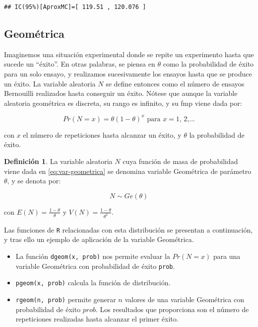 \documentclass[
]{book}
\providecommand{\tightlist}{%
  \setlength{\itemsep}{0pt}\setlength{\parskip}{0pt}}
\newenvironment{yellowbox}{
  \definecolor{shadecolor}{rgb}{210, 180, 140}  
  \color{black}
  \begin{shaded}}
 {\end{shaded}}
\newenvironment{whitebox}{
  \definecolor{shadecolor}{rgb}{255, 255, 255}  
  \color{black}
  \begin{shaded}}
 {\end{shaded}}
\theoremstyle{definition}
\newtheorem{definition}{Definición}[chapter]
\theoremstyle{definition}
\theoremstyle{definition}
\theoremstyle{definition}
\theoremstyle{remark}
\begin{document}
\begin{verbatim}
## IC(95%)[AproxMC]=[ 119.51 , 120.076 ]
\end{verbatim}

\hypertarget{geomuxe9trica}{%
\subsection{Geométrica}\label{geomuxe9trica}}

Imaginemos una situación experimental donde se repite un experimento hasta que sucede un ``éxito''. En otras palabras, se piensa en \(\theta\) como la probabilidad de éxito para un solo ensayo, y realizamos sucesivamente los ensayos hasta que se produce un éxito. La variable aleatoria \(N\) se define entonces como el número de ensayos Bernouilli realizados hasta conseguir un éxito. Nótese que aunque la variable aleatoria geométrica es discreta, su rango es inﬁnito, y su fmp viene dada por:

\begin{equation}
Pr(N = x) = \theta (1-\theta)^{x}  \text{ para } x = \text{1, 2,...}
\label{eq:var-geometrica}
\end{equation}

con \(x\) el número de repeticiones hasta alcanzar un éxito, y \(\theta\) la probabilidad de éxito.

\begin{yellowbox}

\begin{definition}
\protect\hypertarget{def:vgeom}{}{\label{def:vgeom} }La variable aleatoria \(N\) cuya función de masa de probabilidad viene dada en \eqref{eq:var-geometrica} se denomina variable Geométrica de parámetro \(\theta\), y se denota por:

\[N \sim Ge(\theta)\]

con \(E(N) = \frac{1 - \theta}{\theta}\) y \(V(N) = \frac{1-\theta}{\theta^2}.\)\\
\end{definition}

\end{yellowbox}

Las funciones de \texttt{R} relacionadas con esta distribución se presentan a continuación, y tras ello un ejemplo de aplicación de la variable Geométrica.

\begin{whitebox}

\begin{itemize}
\tightlist
\item
  La función \texttt{dgeom(x,\ prob)} nos permite evaluar la \(Pr(N=x)\) para una variable Geométrica con probabilidad de éxito \texttt{prob}.
\item
  \texttt{pgeom(x,\ prob)} calcula la función de distribución.
\item
  \texttt{rgeom(n,\ prob)} permite generar \(n\) valores de una variable Geométrica con probabilidad de éxito \(prob\). Los resultados que proporciona son el número de repeticiones realizadas hasta alcanzar el primer éxito.
\end{itemize}

\end{whitebox}
\end{document}
